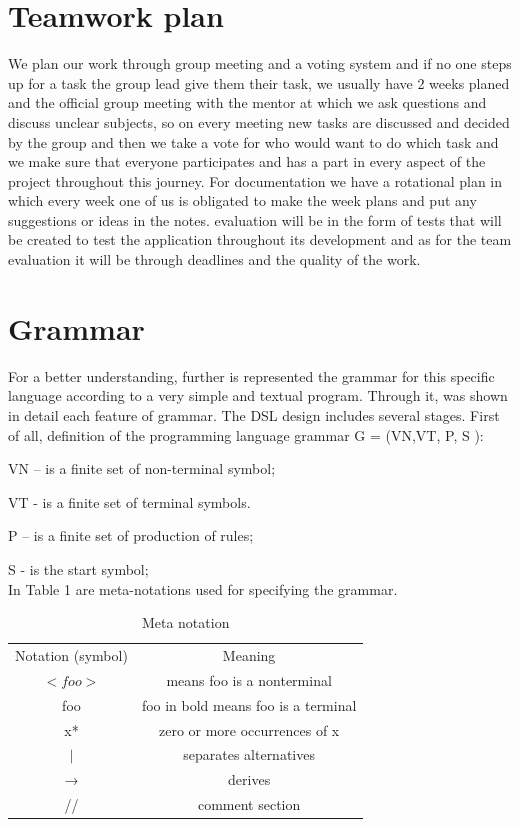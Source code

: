 \section{Teamwork plan}
We plan our work through group meeting and a voting system and if no one steps up for a task the group lead give them their task, we usually have 2 weeks planed and the official group meeting with the mentor at which we ask questions and discuss unclear subjects, so on every meeting new tasks are discussed and decided by the group and then we take a vote for who would want to do which task and we make sure that everyone participates and has a part in every aspect of the project throughout this journey.
For documentation we have a rotational plan in which every week one of us is obligated to make the week plans and put any suggestions or ideas in the notes.
evaluation will be in the form of tests that will be created to test the application throughout its development and as for the team evaluation it will be through deadlines and the quality of the work.


\section{Grammar}

For a better understanding, further is represented the grammar for this specific language according to a very simple and textual program. Through it, was shown in detail each feature of grammar.
The DSL design includes several stages. First of all, definition of the programming
language grammar  
G = (VN,VT, P, S ):

VN – is a finite set of non-terminal symbol;

VT - is a finite set of terminal symbols.

P – is a finite set of production of rules;

S - is the start symbol;\\
\noindent In Table 1 are meta-notations used for specifying the grammar. 

\begin{table}[h]
    \centering
    \caption{Meta notation}
    \begin{tabular}{|c|c|}
        \hline
Notation (symbol) & Meaning\\
\cline{1-2}
$<foo>$ & means foo is a nonterminal\\
\hline
foo & foo in bold means foo is a terminal\\
\hline
x* & zero or more occurrences of x\\
\hline
$|$ & separates alternatives\\
\hline
→ & derives\\
\hline
// & comment section\\
\hline

    \end{tabular}
    \label{tbl:epochs}
\end{table}

